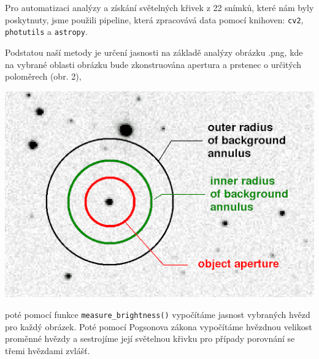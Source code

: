 \documentclass[a4paper,11pt]{article}
\begin{document}
\begin{minipage}[t]{0.5\textwidth}
                \par Pro automatizaci analýzy a získání světelných křivek z 22 snímků, které nám byly poskytnuty, jsme použili pipeline, která zpracovává data pomocí knihoven: \texttt{cv2}, \texttt{photutils} a \texttt{astropy}. 
                \par Podstatou naší metody je určení jasnosti na základě analýzy obrázku .png, kde na vybrané oblasti obrázku bude zkonstruována apertura a prstenec o určitých poloměrech (obr. 2), 

    \end{minipage}

\newpage
    \begin{minipage}[t]{0.5\textwidth} 
                \vspace{10pt}   
                \par \centering
                \includegraphics[scale=0.4]{apert}
                \captionsetup{justification=centering, font=footnotesize}
                \label{fig:apert}
                \vspace{10pt}
                \raggedright 
                
                \par poté pomocí funkce \texttt{measure\_brightness()} vypočítáme jasnost vybraných hvězd pro každý obrázek. Poté pomocí Pogsonova zákona vypočítáme hvězdnou velikost proměnné hvězdy a sestrojíme její světelnou křivku pro případy porovnání se třemi hvězdami zvlášť. 


\end{minipage}
\end{document}
